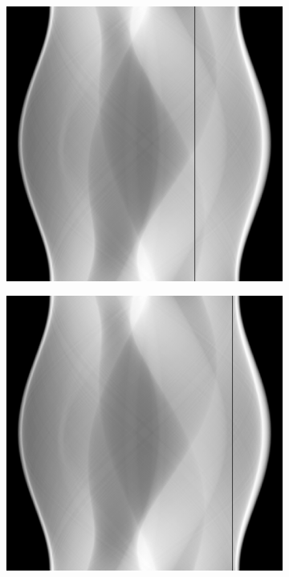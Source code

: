 \documentclass[letterpaper,12pt]{article}
\theoremstyle{plain}
\begin{document}
\begin{figure}[H]
\begin{subfigure}[h]{0.24\textwidth}
       \end{subfigure}
       \begin{subfigure}[h]{0.24\textwidth}
           \centering
           \includegraphics[width=\textwidth]{Figuras/sinograma_250.png}
       \end{subfigure}
       \begin{subfigure}[h]{0.24\textwidth}
           \centering
           \includegraphics[width=\textwidth]{Figuras/sinograma_300.png}

\end{subfigure}
\end{figure}
\end{document}
